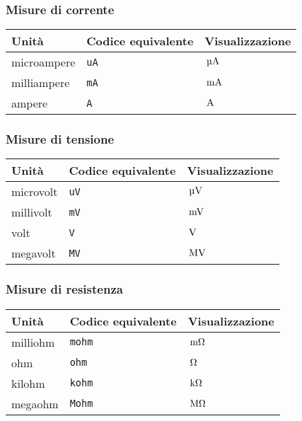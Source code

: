 \documentclass[11pt,a4paper,openany]{book}
\newcommand*{\cs}[1]{\texttt{\char92#1}}
\begin{document}
\subsubsection{Misure di corrente}
\begin{center}
\begin{tabular}{lll}
\toprule
Unità & Codice equivalente & Visualizzazione\\
\midrule
microampere & \cs{uA} & $\uA$ \\
milliampere & \cs{mA} & $\mA$ \\
ampere & \cs{A} & $\A$ \\
\bottomrule
\end{tabular}
\end{center}

\subsubsection{Misure di tensione}
\begin{center}
\begin{tabular}{lll}
\toprule
Unità & Codice equivalente & Visualizzazione\\
\midrule
microvolt & \cs{uV} & $\uV$ \\
millivolt & \cs{mV} & $\mV$ \\
volt & \cs{V} & $\V$\\
megavolt & \cs{MV} & $\MV$\\
\bottomrule
\end{tabular}
\end{center}

\subsubsection{Misure di resistenza}
\begin{center}
\begin{tabular}{lll}
\toprule
Unità & Codice equivalente & Visualizzazione\\
\midrule
milliohm & \cs{mohm} & $\mohm$ \\
ohm & \cs{ohm} & $\ohm$\\
kilohm & \cs{kohm} & $\kohm$\\
megaohm & \cs{Mohm} & $\Mohm$\\
\bottomrule
\end{tabular}
\end{center}
\end{document}
